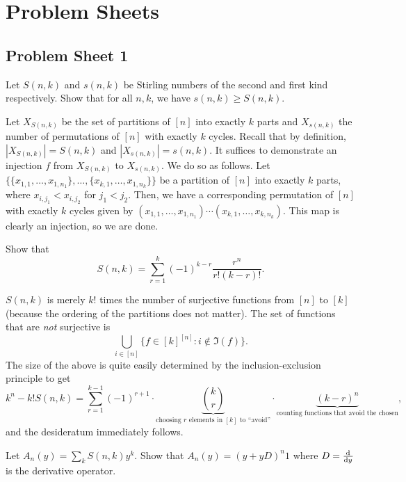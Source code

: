 \section{Problem Sheets}

	\subsection{Problem Sheet 1}

		\begin{problem}
			Let $S(n,k)$ and $s(n,k)$ be Stirling numbers of the second and first kind respectively. Show that for all $n,k$, we have $s(n,k) \ge S(n,k)$.
		\end{problem}
	
		\begin{solution*}
			Let $X_{S(n,k)}$ be the set of partitions of $[n]$ into exactly $k$ parts and $X_{s(n,k)}$ the number of permutations of $[n]$ with exactly $k$ cycles. Recall that by definition, $|X_{S(n,k)}| = S(n,k)$ and $|X_{s(n,k)}| = s(n,k)$. It suffices to demonstrate an injection $f$ from $X_{S(n,k)}$ to $X_{s(n,k)}$. We do so as follows. Let $\{\{x_{1,1},\ldots,x_{1,n_1}\},\ldots,\{x_{k,1},\ldots,x_{1,n_k}\}\}$ be a partition of $[n]$ into exactly $k$ parts, where $x_{i,j_1} < x_{i,j_2}$ for $j_1 < j_2$. Then, we have a corresponding permutation of $[n]$ with exactly $k$ cycles given by $(x_{1,1},\ldots,x_{1,n_1})\cdots(x_{k,1},\ldots,x_{k,n_k})$. This map is clearly an injection, so we are done.
		\end{solution*}

		\begin{problem}
			Show that
			\[ S(n,k) = \sum_{r=1}^k (-1)^{k-r} \frac{r^n}{r!(k-r)!}. \]
		\end{problem}
		\begin{solution*}
			$S(n,k)$ is merely $k!$ times the number of surjective functions from $[n]$ to $[k]$ (because the ordering of the partitions does not matter). The set of functions that are \emph{not} surjective is
			\[ \bigcup_{i \in [n]} \{ f \in [k]^{[n]} : i \not\in \Im(f) \}. \]
			The size of the above is quite easily determined by the inclusion-exclusion principle to get
			\[ k^n - k!S(n,k) = \sum_{r=1}^{k-1} (-1)^{r+1} \cdot \underbrace{\binom{k}{r}}_\text{choosing $r$ elements in $[k]$ to ``avoid''} \cdot \underbrace{(k-r)^n}_\text{counting functions that avoid the chosen}, \]
			and the desideratum immediately follows.
		\end{solution*}

		\begin{problem}
			Let $A_n(y) = \sum_{k} S(n,k) y^k$. Show that $A_n(y) = (y + yD)^n1$ where $D = \od{}{y}$ is the derivative operator.
		\end{problem}
		\begin{solution*}
			
		\end{solution*}

